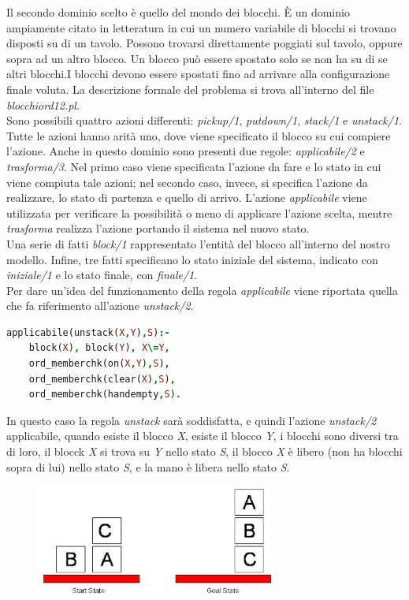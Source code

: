 \documentclass[12pt]{report}
\begin{document}
Il secondo dominio scelto è quello del mondo dei blocchi. \`E un dominio ampiamente citato in letteratura in cui un numero variabile di blocchi si trovano disposti su di un tavolo. Possono trovarsi direttamente poggiati sul tavolo, oppure sopra ad un altro blocco. Un blocco può essere spostato solo se non ha su di se altri blocchi.I blocchi devono essere spostati fino ad arrivare alla configurazione finale voluta.
La descrizione formale del problema si trova all'interno del file \emph{blocchiord12.pl}.\\
Sono possibili quattro azioni differenti: \emph{pickup/1}, \emph{putdown/1}, \emph{stack/1} e \emph{unstack/1}.
Tutte le azioni hanno arit\`a uno, dove viene specificato il blocco su cui compiere l'azione.
Anche in questo dominio sono presenti due regole: \emph{applicabile/2} e \emph{trasforma/3}. Nel primo caso viene specificata l'azione da fare e lo stato in cui viene compiuta tale azioni; nel secondo caso, invece, si specifica l'azione da realizzare, lo stato di partenza e quello di arrivo.
L'azione \emph{applicabile} viene utilizzata per verificare la possibilit\`a o meno di applicare l'azione scelta, mentre \emph{trasforma} realizza l'azione portando il sistema nel nuovo stato.\\
Una serie di fatti \emph{block/1} rappresentato l'entit\`a del blocco all'interno del nostro modello.
Infine, tre fatti specificano lo stato iniziale del sistema, indicato con \emph{iniziale/1} e lo stato finale, con \emph{finale/1}.\\
Per dare un'idea del funzionamento della regola \emph{applicabile} viene riportata quella che fa riferimento all'azione \emph{unstack/2}.

\begin{lstlisting}[language=Prolog]
applicabile(unstack(X,Y),S):-
	block(X), block(Y), X\=Y,
	ord_memberchk(on(X,Y),S),
	ord_memberchk(clear(X),S),
	ord_memberchk(handempty,S).
\end{lstlisting}

In questo caso la regola \emph{unstack} sarà soddisfatta, e quindi l'azione \emph{unstack/2} applicabile, quando esiste il blocco \emph{X}, esiste il blocco \emph{Y}, i blocchi sono diversi tra di loro, il blocck \emph{X} si trova su \emph{Y} nello stato \emph{S}, il blocco \emph{X} è libero (non ha blocchi sopra di lui) nello stato \emph{S}, e la mano è libera nello stato \emph{S}.

\begin{figure}[!ht]
   \centering
   \includegraphics[width=0.7\textwidth]{immagini/blocks.png}
   \caption{}
   \centering
   \label{label: Esempio di mondo dei blocchi}
\end{figure}
\end{document}
